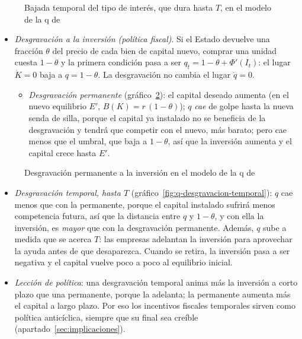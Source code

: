 \documentclass[11pt]{article}
\begin{document}
\begin{figure}[H]
\centering
\caption{Bajada temporal del tipo de interés, que dura hasta $T$, en el modelo de la q de }\label{fig:q-tipo-temporal}
\end{figure}

\begin{itemize}
\item \emph{Desgravación a la inversión (política fiscal)}. Si el Estado devuelve una fracción $\theta$ del precio de cada bien de capital nuevo, comprar una unidad cuesta $1-\theta$ y la primera condición pasa a ser $q_t=1-\theta+\Phi'(I_t)$: el lugar $\dot K=0$ baja a $q=1-\theta$\nocite{Romer2019Advanced}. La desgravación no cambia el lugar $\dot q=0$.
  \begin{itemize}
  \item \emph{Desgravación permanente} (gráfico~\ref{fig:q-desgravacion-permanente}): el capital deseado aumenta (en el nuevo equilibrio $E'$, $B(K)=r\,(1-\theta)$); $q$ \emph{cae} de golpe hasta la nueva senda de silla, porque el capital ya instalado no se beneficia de la desgravación y tendrá que competir con el nuevo, más barato; pero cae menos que el umbral, que baja a $1-\theta$, así que la inversión aumenta y el capital crece hasta $E'$.
  \end{itemize}
\end{itemize}

\begin{figure}[H]
\centering
\caption{Desgravación permanente a la inversión en el modelo de la q de }\label{fig:q-desgravacion-permanente}
\end{figure}

\begin{itemize}
\item \emph{Desgravación temporal, hasta $T$} (gráfico~\ref{fig:q-desgravacion-temporal}): $q$ cae menos que con la permanente, porque el capital instalado sufrirá menos competencia futura, así que la distancia entre $q$ y $1-\theta$, y con ella la inversión, es \emph{mayor} que con la desgravación permanente. Además, $q$ sube a medida que se acerca $T$: las empresas adelantan la inversión para aprovechar la ayuda antes de que desaparezca. Cuando se retira, la inversión pasa a ser negativa y el capital vuelve poco a poco al equilibrio inicial.
\item \emph{Lección de política}: una desgravación temporal anima más la inversión a corto plazo que una permanente, porque la adelanta; la permanente aumenta más el capital a largo plazo\nocite{Abel1982Dynamic}. Por eso los incentivos fiscales temporales sirven como política anticíclica, siempre que su final sea creíble (apartado~\ref{sec:implicaciones}).
\end{itemize}
\end{document}
